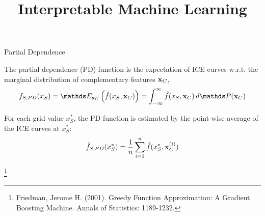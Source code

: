 \documentclass[11pt,compress,t,notes=noshow, aspectratio=169, xcolor=table]{beamer}
\title{Interpretable Machine Learning}
\date{}
\begin{document}
\newcommand{\titlefigure}{figure/pdp_bike}
\newcommand{\learninggoals}{
\item Understand PD plots and their relation to ICE plots
\item Understand how to interpret ICE curves and PD plots
}


\begin{frame}{Partial Dependence}

The partial dependence (PD) function is the expectation of ICE curves w.r.t. the marginal distribution of complementary features $\xv_C$,
$$f_{S, PD}(x_S) = \E_{\xv_C} \left( \fh(x_S, \xv_C) \right) = \int_{-\infty}^{\infty} \fh(x_S, \xv_C) \, d\P(\xv_C)$$

For each grid value $x_S^*$, the PD function is estimated by the point-wise average of the ICE curves at $x_S^*$:
$$\fh_{S, PD}(x_S^*) = \frac{1}{n} \sum_{i=1}^n \fh(x_S^*, \xv_C^{(i)})$$


\footnote[frame]{Friedman, Jerome H. (2001). Greedy Function Approximation: A Gradient Boosting Machine. Annals of Statistics: 1189-1232.}
\end{frame}


\end{document}
